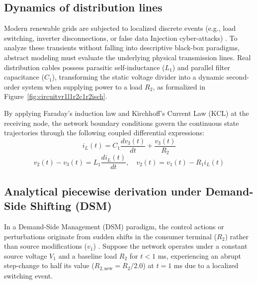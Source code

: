 \documentclass[energies,accept,oneauthor,pdftex]{Definitions/mdpi}
\begin{document}
\subsection{Dynamics of distribution lines}

Modern renewable grids are subjected to localized discrete events (e.g., load switching, inverter disconnections, or false data Injection cyber-attacks) \cite{energysecurity2025enhancing}. To analyze these transients without falling into descriptive black-box paradigms, abstract modeling must evaluate the underlying physical transmission lines. Real distribution cables possess parasitic self-inductance ($L_1$) and parallel filter capacitance ($C_1$), transforming the static voltage divider into a dynamic second-order system when supplying power to a load $R_2$, as formalized in Figure~\ref{fig:circuitvr1l1r2c1r2isch}.


By applying Faraday's induction law and Kirchhoff's Current Law (KCL) at the receiving node, the network boundary conditions govern the continuous state trajectories through the following coupled differential expressions:
\begin{equation}
    i_L(t) = C_1 \frac{dv_3(t)}{dt} + \frac{v_3(t)}{R_2}
    \label{eq:kcl_node3_clean}
\end{equation}
\begin{equation}
    v_2(t) - v_3(t) = L_1 \frac{di_L(t)}{dt}, \quad v_2(t) = v_1(t) - R_1 i_L(t)
\end{equation}



\subsection{Analytical piecewise derivation under Demand-Side Shifting (DSM)}

In a Demand-Side Management (DSM) paradigm, the control actions or perturbations originate from sudden shifts in the consumer terminal ($R_2$) rather than source modifications ($v_1$) \cite{Khan2015}. Suppose the network operates under a constant source voltage $V_1$ and a baseline load $R_2$ for $t < 1$ ms, experiencing an abrupt step-change to half its value ($R_{2,\text{new}} = R_2 / 2.0$) at $t = 1$ ms due to a localized switching event.
\end{document}
